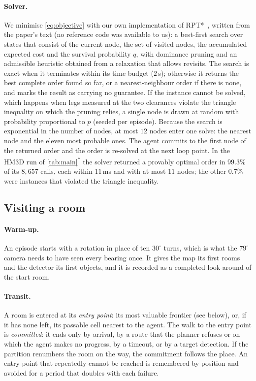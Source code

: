 \documentclass[10pt]{article}
\newcommand{\oldrev}{\textsuperscript{$\ast$}}
\newcommand{\degree}{^{\circ}}
\begin{document}
\paragraph{Solver.} We minimise \cref{eq:objective} with our own
implementation of RPT*~\citep{lyu2026rpt}, written from the paper's text (no
reference code was available to us): a best-first search over states that
consist of the current node, the set of visited nodes, the accumulated
expected cost and the survival probability $q$, with dominance pruning and an
admissible heuristic obtained from a relaxation that allows revisits. The
search is exact when it terminates within its time budget ($2$\,s); otherwise
it returns the best complete order found so far, or a nearest-neighbour order
if there is none, and marks the result as carrying no guarantee. If the
instance cannot be solved, which happens when legs measured at the two
clearances violate the triangle inequality on which the pruning relies, a
single node is drawn at random with probability proportional to $p$ (seeded
per episode). Because the
search is exponential in the number of nodes, at most $12$ nodes enter one
solve: the nearest node and the eleven most probable ones. The agent commits
to the first node of the returned order and the order is re-solved at the next
loop point. In the HM3D run of \cref{tab:main}\oldrev{} the solver returned a
provably optimal order in $99.3\%$ of its $8{,}657$ calls, each within
$11$\,ms and with at most $11$ nodes; the other $0.7\%$ were instances that
violated the triangle inequality.

\subsection{Visiting a room}\label{sec:visits}
\paragraph{Warm-up.} An episode starts with a rotation in place of ten
$30\degree$ turns, which is what the $79\degree$ camera needs to have seen
every bearing once. It gives the map its first rooms and the detector its first
objects, and it is recorded as a completed look-around of the start room.

\paragraph{Transit.} A room is entered at its \emph{entry point}: its most
valuable frontier (see below), or, if it has none left, its passable cell
nearest to the agent. The walk to the entry point is \emph{committed}: it ends
only by arrival, by a route that the planner refuses or on which the agent
makes no progress, by a timeout, or by a target detection. If the partition
renumbers the room on the way, the commitment follows the place. An entry point
that repeatedly cannot be reached is remembered by position and avoided for a
period that doubles with each failure.
\end{document}
